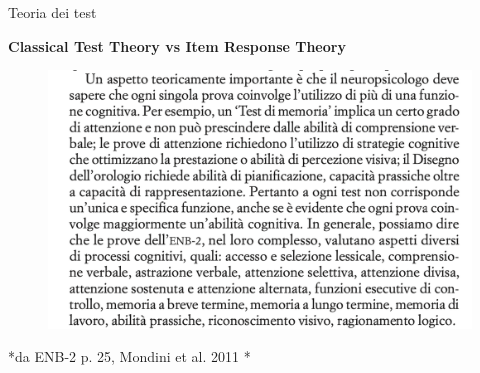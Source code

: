 \documentclass[
  ignorenonframetext,
]{beamer}
\begin{document}
\begin{frame}{Teoria dei test}
\label{teoria-dei-test-11}
\begin{center}
  \textbf{Classical Test Theory vs Item Response Theory}
\end{center}
\vspace{1.5em}

\begin{figure}
  \includegraphics[scale=0.5]{Figures/ENB2_cit.png}
\end{figure}

\footnotesize
\begin{flushright}
*da ENB-2 p. 25, Mondini et al. 2011 *
\end{flushright}
\end{frame}
\end{document}
